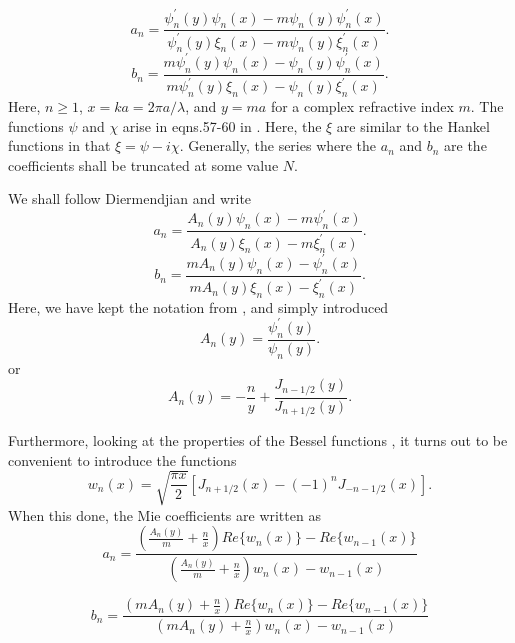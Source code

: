 \documentclass[12pt]{article}
\begin{document}
\begin{equation}
a_n=\frac{\psi^\prime_n(y)\psi_n(x)-m \psi_n(y) \psi^\prime_n(x)}{
   \psi^\prime_n(y) \xi_n(x)-m \psi_n(y) \xi^\prime_n(x)}.
\end{equation}
\begin{equation}
b_n=\frac{m \psi^\prime_n(y)\psi_n(x)- \psi_n(y) \psi^\prime_n(x)}{
  m \psi^\prime_n(y) \xi_n(x)- \psi_n(y) \xi^\prime_n(x)}.
\end{equation}
Here, $n \ge 1$, $x=ka=2 \pi a / \lambda$, and $y=ma$ for a complex refractive index  $m$.   The functions $\psi$ and $\chi$ arise in eqns.57-60 in \cite{EMScatt:Miebib}. Here, the $\xi$ are similar to the Hankel functions in that
$\xi=\psi - i \chi$.
Generally, the series where the $a_n$ and $b_n$ are the coefficients shall be truncated at some value $N$.

We shall follow Diermendjian \cite{Deirmendjian:Miebib} and write
\begin{equation}
a_n=\frac{A_n(y) \psi_n(x)-m \psi^\prime_n(x)}{
   A_n(y) \xi_n(x)-m  \xi^\prime_n(x)}.
\end{equation}
\begin{equation}
b_n=\frac{m A_n(y)\psi_n(x)-  \psi^\prime_n(x)}{
  m A_n(y) \xi_n(x)- \xi^\prime_n(x)}.
\end{equation}
Here, we have kept the notation from \cite{EMScatt:Miebib} , and simply introduced\begin{equation}
A_n(y)=\frac{\psi_n^\prime(y)}{\psi_n(y)}.
\end{equation}
or 
\begin{equation}
A_n(y)=-\frac{n}{y}+\frac{J_{n-1/2}(y)}{J_{n+1/2}(y) }.
\end{equation}

Furthermore, looking at the properties of the Bessel functions \cite{AbramowitzStegun:Miebib}, it turns out to be convenient to introduce the functions
\begin{equation}
w_n(x)=\sqrt{\frac{\pi x}{2}} [ J_{n+1/2}(x)-(-1)^n J_{-n-1/2}(x)].
\end{equation}
When this done, the Mie coefficients are written as
\begin{equation}
a_n=\frac{ \left ( 
\frac{A_n(y)}{m}+\frac{n}{x}
 \right )
Re \lbrace w_n(x) \rbrace -Re \lbrace w_{n-1}(x) \rbrace
}
{ \left ( 
\frac{A_n(y)}{m}+\frac{n}{x} 
\right )
 w_n(x) - w_{n-1}(x) }
\end{equation}

\begin{equation}
b_n=\frac{ \left ( 
m A_n(y)+\frac{n}{x}
 \right )
Re \lbrace w_n(x) \rbrace -Re \lbrace w_{n-1}(x) \rbrace
}
{ \left ( 
m A_n(y)+\frac{n}{x} 
\right )
 w_n(x) - w_{n-1}(x) }
\end{equation}
\end{document}
